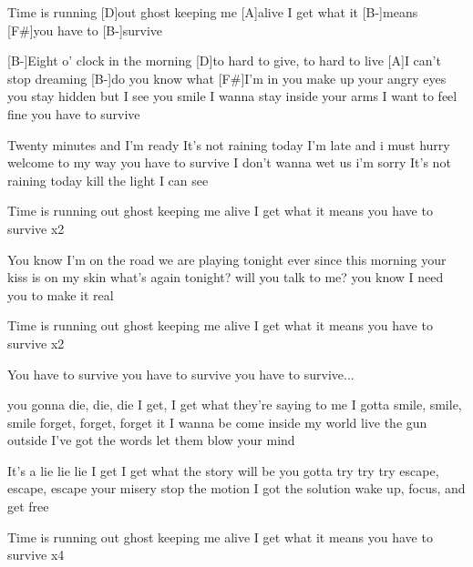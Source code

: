 
\begin{guitar}
[B-]Time is running [D]out
ghost keeping me [A]alive
I get what it [B-]means
[F#]you have to [B-]survive


[B-]Eight o' clock in the morning
[D]to hard to give, to hard to live
[A]I can't stop dreaming
[B-]do you know what [F#]I'm in
you make up your angry eyes
you stay hidden but I see you smile
I wanna stay inside your arms
I want to feel fine
you have to survive

Twenty minutes and I'm ready
It's not raining today
I'm late and i must hurry
welcome to my way
you have to survive
I don't wanna wet us i'm sorry
It's not raining today
kill the light
I can see

Time is running out
ghost keeping me alive
I get what it means
you have to survive x2

You know I'm on the road
we are playing tonight
ever since this morning
your kiss is on my skin
what's again tonight?
will you talk to me?
you know I need you
to make it real

Time is running out
ghost keeping me alive
I get what it means
you have to survive x2


You have to survive
you have to survive
you have to survive...

you gonna die, die, die
I get, I get what they're saying to me
I gotta smile, smile, smile
forget, forget, forget it I wanna be
come inside my world
live the gun outside
I've got the words
let them blow your mind

It's a lie lie lie
I get I get what the story will be
you gotta try try try
escape, escape, escape your misery
stop the motion
I got the solution
wake up, focus, and get free

Time is running out
ghost keeping me alive
I get what it means
you have to survive x4
\end{guitar}